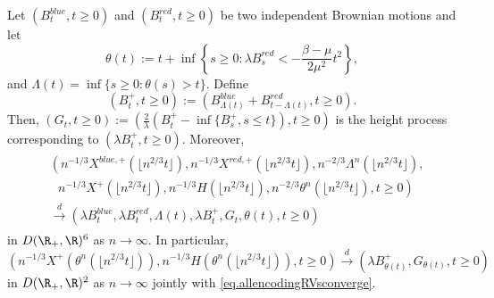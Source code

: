 \begin{lemma}\label{lemma.convergenceX+}
Let $(B^{blue}_t, t \geq 0)$ and $(B^{red}_t, t\geq 0)$ be two independent Brownian motions and let $$\theta(t):=t+\inf\left\{s\geq 0 : \lambda B^{red}_s< -\frac{\beta - \mu}{2\mu^2} t^2\right\},$$ and $\Lambda(t)=\inf\{s\geq 0:\theta(s)> t\}$. Define \begin{equation}\label{eq.definitionB^+}\left(B^+_t,t \geq 0\right):=\left( B^{blue}_{\Lambda(t)}+ B^{red}_{t-\Lambda(t)}, t\geq 0\right).\end{equation}
Then, $(G_t, t\geq 0):=\left(\frac{2}{\lambda}(B^+_t-\inf\{B^+_s,s\leq t\}),t\geq 0\right)$ is the height process corresponding to $\left(\lambda B^+_t,t \geq 0\right)$.
Moreover,
\begin{align}\begin{split}\label{eq.allencodingRVsconverge}&\left(n^{-1/3}X^{blue,+}\left(\lfloor n^{2/3}t \rfloor \right), n^{-1/3}X^{red,+}\left(\lfloor n^{2/3}t \rfloor \right),n^{-2/3} \Lambda^n\left(\lfloor n^{2/3}t\rfloor \right), \right.\\&\left.\,\,\,\,  n^{-1/3}X^+\left( \lfloor n^{2/3}t \rfloor \right), n^{-1/3}H\left( \lfloor n^{2/3}t \rfloor \right), n^{-2/3}\theta^n\left(\lfloor n^{2/3}t\rfloor \right),t\geq 0\right)\\
&\overset{d}{\to} \left(\lambda B^{blue}_t,\lambda B^{red}_t, \Lambda(t), \lambda B^+_{t} ,G_{t}, \theta(t), t\geq 0 \right)\end{split}\end{align}
in $D(\R_+,\R)^6 $ as $n\to \infty$. In particular,
\begin{equation}\label{eq.convergencecompX^+andtheta}\left(n^{-1/3}X^+\left(\theta^n \left(\lfloor n^{2/3}t\rfloor \right)\right), n^{-1/3}H\left(\theta^n\left(\lfloor n^{2/3}t\rfloor \right) \right),t\geq 0 \right) \overset{d}{\to} \left(\lambda B^+_{\theta(t)}, G_{\theta(t)},t\geq 0\right)\end{equation}
in $D(\R_+,\R)^2$ as $n\to \infty$ jointly with \eqref{eq.allencodingRVsconverge}.
\end{lemma}
